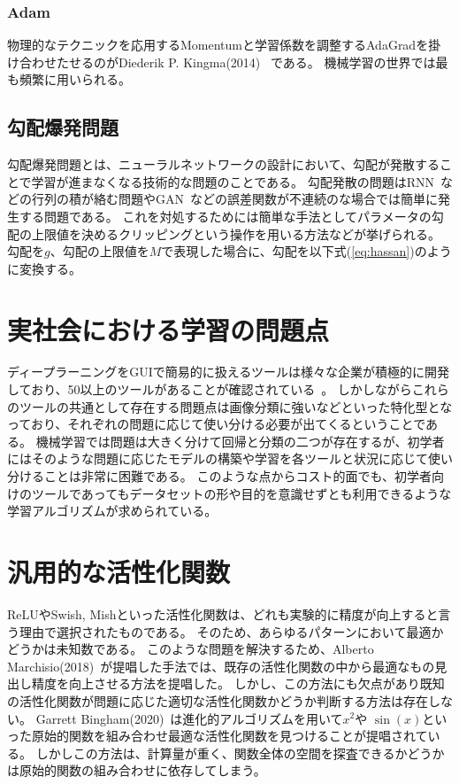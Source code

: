 \subsubsection{Adam}
物理的なテクニックを応用するMomentumと学習係数を調整するAdaGradを掛け合わせたせるのがDiederik P. Kingma(2014)~\cite{adam} である。
機械学習の世界では最も頻繁に用いられる。


\subsection{勾配爆発問題}
勾配爆発問題とは、ニューラルネットワークの設計において、勾配が発散することで学習が進まなくなる技術的な問題のことである。
勾配発散の問題はRNN~\cite{rnn}などの行列の積が絡む問題やGAN~\cite{gan}などの誤差関数が不連続のな場合では簡単に発生する問題である。
これを対処するためには簡単な手法としてパラメータの勾配の上限値を決めるクリッピングという操作を用いる方法などが挙げられる。
勾配を$ g $、勾配の上限値を$ M $で表現した場合に、勾配を以下式(\ref{eq:hassan})のように変換する。



\section{実社会における学習の問題点}

ディープラーニングをGUIで簡易的に扱えるツールは様々な企業が積極的に開発しており、50以上のツールがあることが確認されている~\cite{gui}。
しかしながらこれらのツールの共通として存在する問題点は画像分類に強いなどといった特化型となっており、それぞれの問題に応じて使い分ける必要が出てくるということである。
機械学習では問題は大きく分けて回帰と分類の二つが存在するが、初学者にはそのような問題に応じたモデルの構築や学習を各ツールと状況に応じて使い分けることは非常に困難である。
このような点からコスト的面でも、初学者向けのツールであってもデータセットの形や目的を意識せずとも利用できるような学習アルゴリズムが求められている。


\section{汎用的な活性化関数}

ReLUやSwish, Mishといった活性化関数は、どれも実験的に精度が向上すると言う理由で選択されたものである。
そのため、あらゆるパターンにおいて最適かどうかは未知数である。
このような問題を解決するため、Alberto Marchisio(2018)~\cite{automatic_af}が提唱した手法では、既存の活性化関数の中から最適なもの見出し精度を向上させる方法を提唱した。
しかし、この方法にも欠点があり既知の活性化関数が問題に応じた適切な活性化関数かどうか判断する方法は存在しない。
Garrett Bingham(2020)~\cite{evo_af}は進化的アルゴリズムを用いて$ x^2 $や $ \sin (x) $といった原始的関数を組み合わせ最適な活性化関数を見つけることが提唱されている。
しかしこの方法は、計算量が重く、関数全体の空間を探査できるかどうかは原始的関数の組み合わせに依存してしまう。




